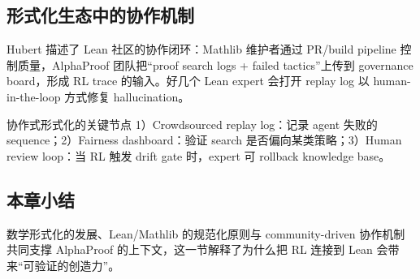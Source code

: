 \subsection{形式化生态中的协作机制}
Hubert 描述了 Lean 社区的协作闭环：Mathlib 维护者通过 PR/build pipeline 控制质量，AlphaProof 团队把“proof search logs + failed tactics”上传到 governance board，形成 RL trace 的输入。好几个 Lean expert 会打开 replay log 以 human-in-the-loop 方式修复 hallucination。

\begin{knowledgebox}{协作式形式化的关键节点}
1）Crowdsourced replay log：记录 agent 失败的 sequence；2）Fairness dashboard：验证 search 是否偏向某类策略；3）Human review loop：当 RL 触发 drift gate 时，expert 可 rollback knowledge base。
\end{knowledgebox}

\subsection{本章小结}
数学形式化的发展、Lean/Mathlib 的规范化原则与 community-driven 协作机制共同支撑 AlphaProof 的上下文，这一节解释了为什么把 RL 连接到 Lean 会带来“可验证的创造力”。
\newpage

